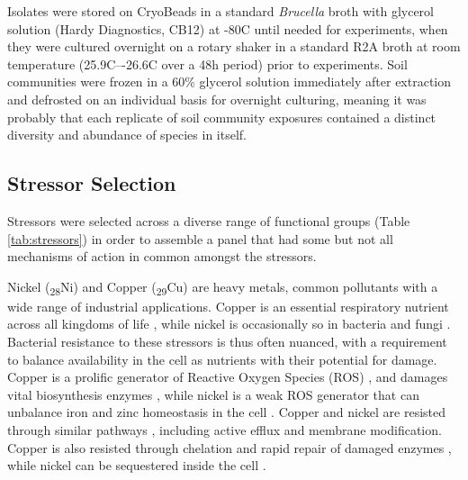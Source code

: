 \documentclass[final,1p,times]{elsarticle}
\begin{document}
Isolates were stored on CryoBeads in a standard \textit{Brucella} broth with glycerol solution (Hardy Diagnostics, CB12) at -80\textdegree C until needed for experiments, when they were cultured overnight on a rotary shaker in a standard R2A broth at room temperature (25.9\textdegree C–-26.6\textdegree C over a 48h period) prior to experiments. Soil communities were frozen in a 60\% glycerol solution immediately after extraction and defrosted on an individual basis for overnight culturing, meaning it was probably that each replicate of soil community exposures contained a distinct diversity and abundance of species in itself. 

\subsection{Stressor Selection}
\label{S:2:2}

Stressors were selected across a diverse range of functional groups (Table \ref{tab:stressors}) in order to assemble a panel that had some but not all mechanisms of action in common amongst the stressors.

Nickel (\textsubscript{28}Ni) and Copper (\textsubscript{29}Cu) are heavy metals, common pollutants with a wide range of industrial applications. Copper is an essential respiratory nutrient across all kingdoms of life \cite{Babcock1992OxygenRespiration}, while nickel is occasionally so in bacteria and fungi \cite{Zamble2015NickelBiology}. Bacterial resistance to these stressors is thus often nuanced, with a requirement to balance availability in the cell as nutrients with their potential for damage.  Copper is a prolific generator of Reactive Oxygen Species (ROS) \cite{Bal2002InductionMetals}, and damages vital biosynthesis enzymes \cite{Macomber2009TheToxicity}, while nickel is a weak ROS generator that can unbalance iron and zinc homeostasis in the cell \cite{Samland2006MicrobialDevelopments}. Copper and nickel are resisted through similar pathways \cite{Mykytczuk2011CytoplasmicFerrooxidans}, including active efflux and membrane modification. Copper is also resisted through chelation and rapid repair of damaged enzymes \cite{Macomber2009TheToxicity}, while nickel can be sequestered inside the cell \cite{Nishimura1998ProtonCerevisiae}.
\end{document}
